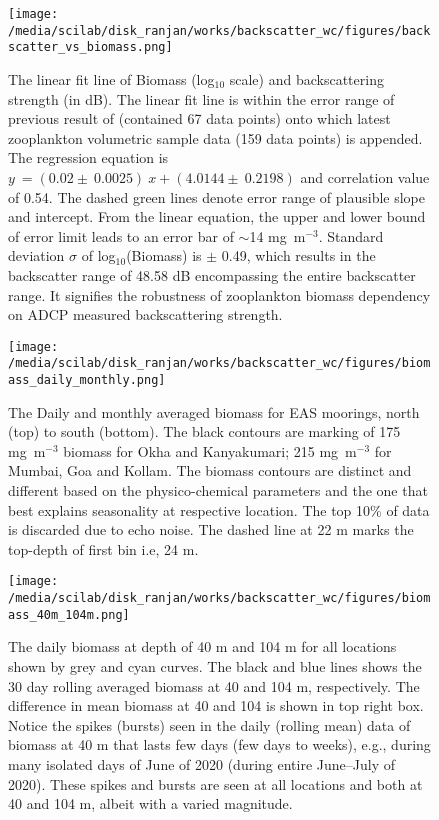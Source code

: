 \documentclass{article}
\begin{document}
\newpage
\begin{figure}[htbp]
	\centering
	\texttt{[image: /media/scilab/disk\_ranjan/works/backscatter\_wc/figures/backscatter\_vs\_biomass.png]} 
	\captionsetup{justification=justified,font=footnotesize,skip=0.05\baselineskip,width=0.8\textwidth}
	\caption{The linear fit line of Biomass (log$_{10}$ scale) and backscattering strength (in dB). The linear fit line is within the error range of previous result of \citep{aparna2022seasonal} (contained 67 data points) onto which latest zooplankton volumetric sample data (159 data points) is appended. The regression equation is $y\ = (0.02 \pm\ 0.0025) \ x + (4.0144 \pm \ 0.2198) $ and correlation value of 0.54. The dashed green lines denote error range of plausible slope and intercept. From the linear equation, the upper and lower bound of error limit leads to an error bar of $\sim$14  mg~m$^{-3}$. Standard deviation $\sigma$ of log$_{10}$(Biomass) is $\pm$ 0.49, which results in the backscatter range of 48.58 dB encompassing the entire backscatter range. It signifies the robustness of zooplankton biomass dependency on ADCP measured backscattering strength.}
	\label{fig:bstobm}
\end{figure}

\newpage

\begin{figure}[htbp]
	\centering
	\texttt{[image: /media/scilab/disk\_ranjan/works/backscatter\_wc/figures/biomass\_daily\_monthly.png]} 
	\captionsetup{justification=justified,font=footnotesize,skip=0.05\baselineskip,width=\textwidth}
	\caption{The Daily and monthly averaged biomass for EAS moorings, north (top) to south (bottom). The black contours are marking of 175 mg~m$^{-3}$ biomass for Okha and Kanyakumari; 215 mg~m$^{-3}$  for Mumbai, Goa and Kollam. The biomass contours are distinct and different based on the physico-chemical parameters and the one that best explains seasonality at respective location.  The top 10\% of data is discarded due to echo noise. The dashed line at 22 m marks the top-depth of first bin i.e, 24 m.}
	\label{fig:dailynmonthly}
\end{figure}

\begin{figure}[htbp]
	\centering
	\texttt{[image: /media/scilab/disk\_ranjan/works/backscatter\_wc/figures/biomass\_40m\_104m.png]} 
	\captionsetup{justification=justified,font=footnotesize,skip=0.05\baselineskip,width=\textwidth}
	\caption{The daily biomass at depth of 40 m and 104 m for all locations shown by grey and cyan curves. The black and blue lines shows the 30 day rolling averaged biomass at 40 and 104 m, respectively. The difference in mean biomass at 40 and 104 is shown in top right box. Notice the spikes (bursts) seen in the daily (rolling mean) data of biomass at 40 m that lasts few days (few days to weeks), e.g., during many isolated days of June of 2020 (during entire June--July of 2020). These spikes and bursts are seen at all locations and both at 40 and 104 m, albeit with a varied magnitude.}
	\label{fig:compfourty}
\end{figure}
\end{document}
